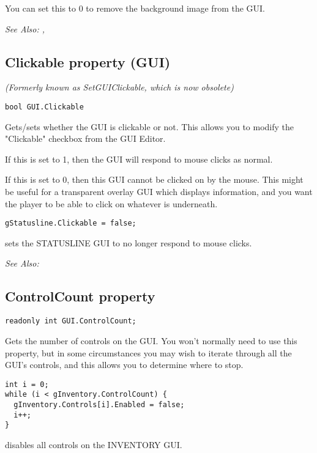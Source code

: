 You can set this to 0 to remove the background image from the GUI.

\it{See Also:} ,



\subsection{Clickable property (GUI)}\label{GUI.Clickable}%

\it{(Formerly known as SetGUIClickable, which is now obsolete)}

\begin{verbatim}
bool GUI.Clickable
\end{verbatim}
Gets/sets whether the GUI is clickable or not. This allows you to modify the "Clickable"
checkbox from the GUI Editor.

If this is set to 1, then the GUI will respond to mouse clicks as normal.

If this is set to 0, then this GUI cannot be clicked on by the mouse. This might be
useful for a transparent overlay GUI which displays information, and you want the
player to be able to click on whatever is underneath.

\begin{verbatim}
gStatusline.Clickable = false;
\end{verbatim}
sets the STATUSLINE GUI to no longer respond to mouse clicks.

\it{See Also:} 


\subsection{ControlCount property}\label{GUI.ControlCount}%

\begin{verbatim}
readonly int GUI.ControlCount;
\end{verbatim}
Gets the number of controls on the GUI. You won't normally need to use this property,
but in some circumstances you may wish to iterate through all the GUI's controls,
and this allows you to determine where to stop.

\begin{verbatim}
int i = 0;
while (i < gInventory.ControlCount) {
  gInventory.Controls[i].Enabled = false;
  i++;
}
\end{verbatim}
disables all controls on the INVENTORY GUI.

